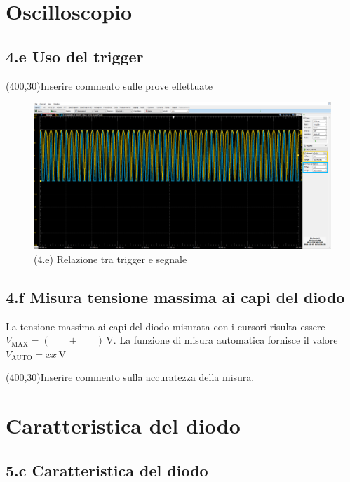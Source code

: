 \documentclass[10pt,a4paper]{article}
\newcommand{\exn}{\phantom{xxx}}
\begin{document}
\section{Oscilloscopio}

\subsection*{4.e Uso del trigger}

\exn 
\par
\vspace{0.5cm}
\framebox(400,30){Inserire commento sulle prove effettuate }

\begin{figure}[h]
\centering
\includegraphics[scale=0.3]{trgdiode}
\caption{(4.e) Relazione tra trigger e segnale}
\end{figure}


\subsection*{4.f Misura tensione massima ai capi del diodo}
\par 
La tensione massima ai capi del diodo misurata con i cursori risulta essere
$V_{\mathrm{MAX}}= ( \exn \pm \exn ) \,\mathrm{V}$. La funzione di misura
automatica fornisce il valore $V_{\mathrm{AUTO}}= xx \,\mathrm{V}$

\vspace{0.5cm} 
\framebox(400,30){Inserire commento sulla accuratezza della misura.}



\section{Caratteristica del diodo}
\par

\subsection*{5.c Caratteristica del diodo}
\end{document}
